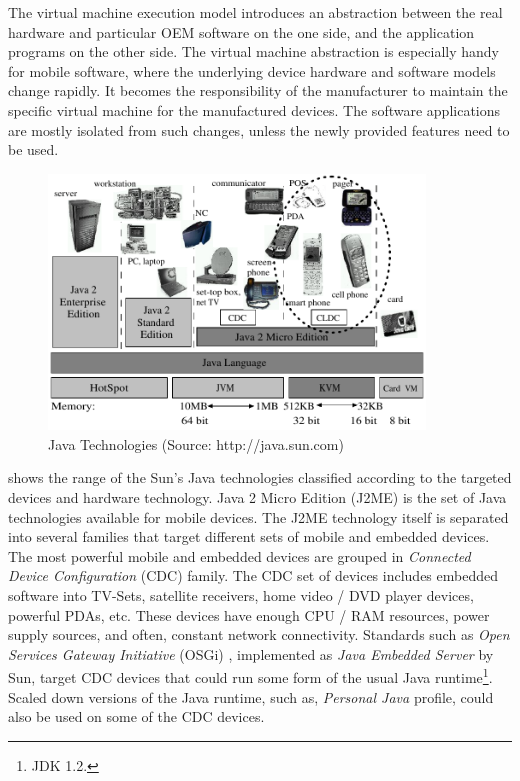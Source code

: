 The virtual machine execution model introduces an abstraction between the real hardware and particular OEM software on the one side, and the application programs on the other side. The virtual machine abstraction is especially handy for mobile software, where the underlying device hardware and software models change rapidly. It becomes the responsibility of the manufacturer to maintain the specific virtual machine for the manufactured devices. The software applications are mostly isolated from such changes, unless the newly provided features need to be used.

\begin{figure}[ht]
	\begin{center}
		\includegraphics[width=10cm,height=!]{ch02/java}
	\end{center}
	\caption{Java Technologies (Source: http://java.sun.com)}
	\label{fig:java}
\end{figure}

 shows the range of the Sun's Java technologies classified according to the targeted devices and hardware technology. Java 2 Micro Edition (J2ME) is the set of Java technologies available for mobile devices. The J2ME technology itself is separated into several families that target different sets of mobile and embedded devices. The most powerful mobile and embedded devices are grouped in \textit{Connected Device Configuration} (CDC) family. The CDC set of devices includes embedded software into TV-Sets, satellite receivers, home video / DVD player devices, powerful PDAs, etc. These devices have enough CPU / RAM resources, power supply sources, and often, constant network connectivity. Standards such as \textit{Open Services Gateway Initiative} (OSGi) \cite{www.osgis}, implemented as \textit{Java Embedded Server} by Sun, target CDC devices that could run some form of the usual Java runtime\footnote{JDK 1.2.}. Scaled down versions of the Java runtime, such as, \textit{Personal Java} profile, could also be used on some of the CDC devices.

